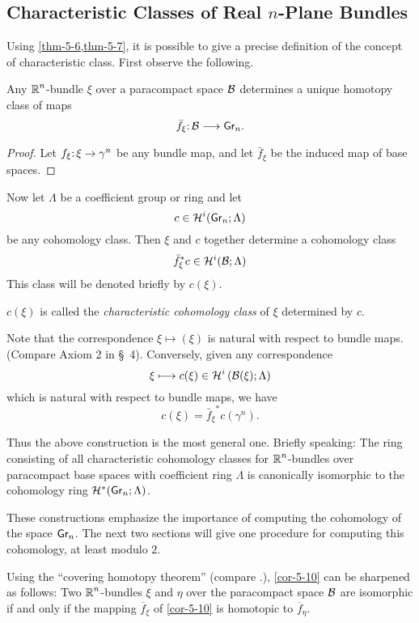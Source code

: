 \subsection*{Characteristic Classes of Real $n$-Plane Bundles}
Using \cref{thm-5-6,thm-5-7}, it is possible to give a precise definition of the
concept of characteristic class. First observe the following.
\begin{corollary}\label{cor-5-10}
	Any $\boldsymbol{\mathbb{R}}^n$-bundle $\xi$ over a paracompact space
	$\mathcal{B} $ determines a unique homotopy class of maps
	\[\map{\bar{f}_\xi}{\B }{\grass{n}{}}.\]
\end{corollary}
\begin{proof}
	Let $\map{f_\xi}{\xi}{\gamma^n}$ be any bundle map, and let $\bar{f}_\xi$ be the induced
	map of base spaces.
\end{proof}
Now let $\Lambda$ be a coefficient group or ring and let
\[c\in\homology^i(\grass{n}{};\Lambda)\]
be any cohomology class. Then $\xi$ and $c$ together determine a cohomology
class
\[{\bar{f}_\xi}^{*} c\in\mathcal{H}^i(\mathcal{B} ;\Lambda)\]
This class will be denoted briefly by $c(\xi)$.







\begin{definition}\label{def:5-6}
	$c(\xi)$ is called the \textit{characteristic cohomology class} of
	$\xi$ determined by $c$.
	
\end{definition}Note that the correspondence $\xi \mapsto(\xi)$ is natural with respect to
bundle maps. (Compare Axiom 2 in \S~4). Conversely, given any 
correspondence
\[\xi\longmapsto c(\xi)\in \mathcal{H}^i\left(\mathcal{B} (\xi);\Lambda\right)\]
which is natural with respect to bundle maps, we have
\[c(\xi)={\bar{f}_\xi}^{*}c(\gamma^n).\]

Thus the above construction is the most general one. Briefly speaking:
The ring consisting of all characteristic cohomology classes for $\boldsymbol{\mathbb{R}}^n$-bundles over paracompact base spaces with coefficient ring $\Lambda$ is canonically isomorphic to the cohomology ring $\homology^* (\grass{n}{}; \Lambda)$.

These constructions emphasize the importance of computing the
cohomology of the space $\grass{n}{}$. The next two sections will give one 
procedure for computing this cohomology, at least modulo $2$.


\begin{remark*}
Using the ``covering homotopy theorem'' (compare 
\cite{84,83}.), \cref{cor-5-10} can be sharpened as follows: Two $\boldsymbol{\mathbb{R}}^n$-bundles $\xi$ and $\eta$ over the paracompact space $\mathcal{B} $ are isomorphic if and
only if the mapping $\overline{f}_\xi$ of \cref{cor-5-10} is homotopic to $\overline{f}_\eta$.	
\end{remark*}

